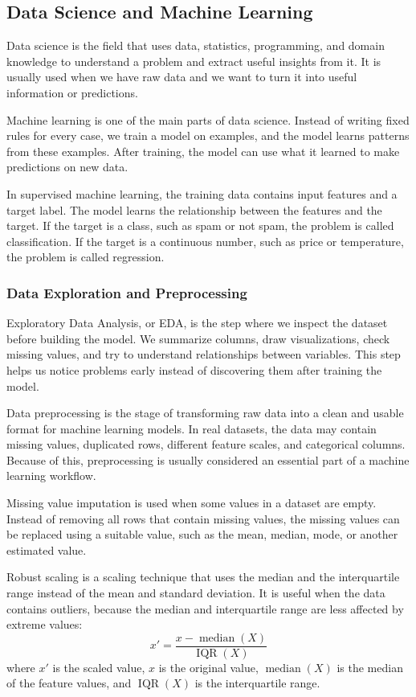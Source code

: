 \documentclass[12pt,a4paper,oneside]{report}
\begin{document}
\subsection{Data Science and Machine Learning}
Data science is the field that uses data, statistics, programming, and domain
knowledge to understand a problem and extract useful insights from it. It is
usually used when we have raw data and we want to turn it into useful
information or predictions.

\noindent Machine learning is one of the main parts of data science. Instead of writing
fixed rules for every case, we train a model on examples, and the model learns
patterns from these examples. After training, the model can use what it learned
to make predictions on new data.

\noindent In supervised machine learning, the training data contains input features and a
target label. The model learns the relationship between the features and the
target. If the target is a class, such as spam or not spam, the problem is called
classification. If the target is a continuous number, such as price or
temperature, the problem is called regression.

\subsubsection{Data Exploration and Preprocessing ~\cite{komorowski2016exploratory}}
Exploratory Data Analysis, or EDA, is the step where we inspect the dataset
before building the model. We summarize columns, draw visualizations, check
missing values, and try to understand relationships between variables. This step
helps us notice problems early instead of discovering them after training the
model.

\noindent Data preprocessing is the stage of transforming raw data into a clean and usable
format for machine learning models. In real datasets, the data may contain
missing values, duplicated rows, different feature scales, and categorical
columns. Because of this, preprocessing is usually considered an essential part of a machine learning
workflow.

\noindent Missing value imputation is used when some values in a dataset are empty.
Instead of removing all rows that contain missing values, the missing values can
be replaced using a suitable value, such as the mean, median, mode, or another
estimated value.

\noindent Robust scaling is a scaling technique that uses the median and the interquartile
range instead of the mean and standard deviation. It is useful when the data
contains outliers, because the median and interquartile range are less affected
by extreme values:
\[
x' = \frac{x - \mathop{\mathrm{median}}(X)}{\mathop{\mathrm{IQR}}(X)}
\]
where $x'$ is the scaled value, $x$ is the original value,
$\mathop{\mathrm{median}}(X)$ is the median of the feature values, and
$\mathop{\mathrm{IQR}}(X)$ is the interquartile range.
\end{document}
